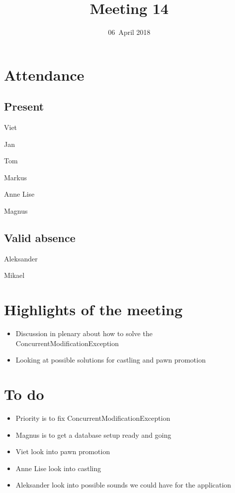 \documentclass[letterpaper,11pt]{article}
\title{Meeting 14}
\date{06~April 2018}
\begin{document}
\maketitle
\section*{Attendance}
\subsection*{Present}
\begin{list}{}{}
	\item Viet
	\item Jan
	\item Tom
	\item Markus
	\item Anne Lise
	\item Magnus
\end{list}

\subsection*{Valid absence}
\begin{list}{}{}
	\item Aleksander
	\item Mikael
\end{list}

\newpage
\section*{Highlights of the meeting}
\begin{itemize}
	\item Discussion in plenary about how to solve the ConcurrentModificationException
	\item Looking at possible solutions for castling and pawn promotion
\end{itemize}

\section*{To do}
\begin{itemize}
	\item Priority is to fix ConcurrentModificationException
	\item Magnus is to get a database setup ready and going
	\item Viet look into pawn promotion
	\item Anne Lise look into castling
	\item Aleksander look into possible sounds we could have for the application
\end{itemize}
\end{document}
